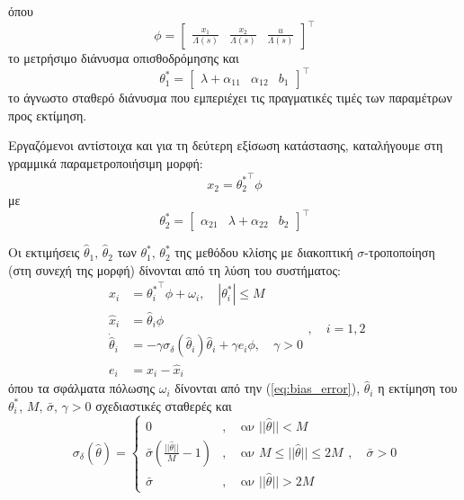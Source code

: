 \documentclass[a4paper,12pt]{article}
\begin{document}
όπου
\begin{equation}
    \phi = 
    \begin{bmatrix}
        \frac{x_1}{\Lambda(s)} & \frac{x_2}{\Lambda(s)} & \frac{u}{\Lambda(s)}
    \end{bmatrix}^{\top}
    \label{eq:regresson_vector}
\end{equation}
το μετρήσιμο διάνυσμα οπισθοδρόμησης και
\begin{equation}
    \theta_1^* = 
    \begin{bmatrix}
        \lambda + \alpha_{11} & \alpha_{12} & b_1
    \end{bmatrix}^{\top}
    \label{eq:theta_star_1}
\end{equation}
το άγνωστο σταθερό διάνυσμα που εμπεριέχει τις πραγματικές τιμές των παραμέτρων προς εκτίμηση.

Εργαζόμενοι αντίστοιχα και για τη δεύτερη εξίσωση κατάστασης, καταλήγουμε στη γραμμικά 
παραμετροποιήσιμη μορφή:
\[
    x_2 = {\theta_2^*}^{\top} \phi
\]
με
\begin{equation}
    \theta_2^* = 
    \begin{bmatrix}
        \alpha_{21} & \lambda + \alpha_{22} & b_2
    \end{bmatrix}^{\top}
    \label{eq:theta_star_2}
\end{equation}

Οι εκτιμήσεις $\hat{\theta}_1, \, \hat{\theta}_2$ των $\theta_1^*, \, \theta_2^*$ της μεθόδου κλίσης με διακοπτική $\sigma$-τροποποίηση (στη συνεχή της μορφή) δίνονται από τη λύση του συστήματος:
\begin{equation}
    \begin{aligned}
    x_i &= {\theta_i^*}^{\top} \phi + \omega_i, \quad |\theta_i^*| \leq M \\
    \hat{x}_i &= \hat{\theta}_i \phi \\
    \dot{\hat{\theta}}_i &= - \gamma \sigma_{\delta}(\hat{\theta}_i) \hat{\theta}_i + 
    \gamma e_i \phi, \quad \gamma > 0 \\
    e_i &= x_i - \hat{x}_i
    \end{aligned}, \quad i = 1, 2
    \label{eq:gradient_switching_sigma_modification}
\end{equation}
όπου τα σφάλματα πόλωσης $\omega_i$ δίνονται από την (\ref{eq:bias_error}), $\hat{\theta}_i$ η εκτίμηση
του $\theta_i^*$, $M, \, \bar{\sigma}, \, \gamma > 0$ σχεδιαστικές σταθερές και
\begin{equation*}
    \sigma_{\delta}(\hat{\theta}) = 
    \left\{
    \begin{aligned}
        0&, \quad \texttt{αν } ||\hat{\theta}|| < M \\
        \bar{\sigma}\left(\frac{||\hat{\theta}||}{M} - 1\right)&, 
        \quad \texttt{αν } M \leq ||\hat{\theta}|| \leq 2M \\
        \bar{\sigma}&, \quad \texttt{αν } ||\hat{\theta}|| > 2M
    \end{aligned}, \quad \bar{\sigma} > 0
    \right.
\end{equation*}
\end{document}
